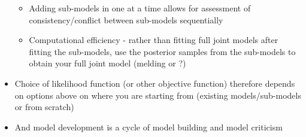 \documentclass{article}
\begin{document}
\begin{itemize}
\begin{itemize}
        \item Adding sub-models in one at a time allows for assessment of consistency/conflict between sub-models sequentially
        \item Computational efficiency - rather than fitting full joint models after fitting the sub-models, use the posterior samples from the sub-models to obtain your full joint model (melding or ?)
    \end{itemize}
    \item Choice of likelihood function (or other objective function) therefore depends on options above on where you are starting from (existing models/sub-models or from scratch)
    \item And model development is a cycle of model building and model criticism
\end{itemize}
\end{document}
